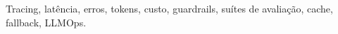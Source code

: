 
Tracing, latência, erros, tokens, custo, guardrails, suítes de avaliação, cache, fallback, LLMOps.

